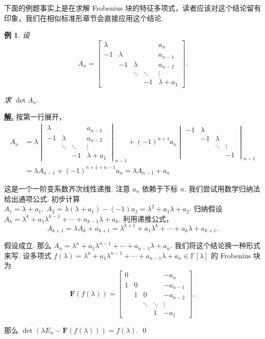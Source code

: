 \documentclass[10pt,openany]{article}
\theoremstyle{thmstyle} %
\theoremstyle{defstyle} %
\theoremstyle{prostyle} %
\theoremstyle{exastyle}
\newtheorem{example}[theorem]{例}
\theoremstyle{remstyle}
\newenvironment{solution}{\par\underline{\textbf{解.}} \;\fangsong}{\qed\par}
\newcommand{\F}{\mathbb{F}}
\begin{document}
下面的例题事实上是在求解 Frobenius 块的特征多项式，读者应该对这个结论留有印象，我们在相似标准形章节会直接应用这个结论.

\begin{example}
	设
	\[
	A_n =
	\begin{bmatrix}
		\lambda &        &        &        & a_n \\
		-1      & \lambda &       &        & a_{n-1} \\
		& -1     & \lambda &       & a_{n-2} \\
		&        & \ddots & \ddots & \vdots \\
		&        &        & -1     & \lambda + a_1
	\end{bmatrix}.
	\]
	
	求 \( \det A_n \).
\end{example}

\begin{solution}
	按第一行展开，
	\begin{align*}
		A_n&= \lambda \begin{vmatrix}
			\lambda &       &        & a_{n-1} \\
			-1     & \lambda &       & a_{n-2} \\
			& \ddots & \ddots & \vdots \\
			&        & -1     & \lambda + a_1
		\end{vmatrix}_{n-1}+ (-1)^{n+1} a_n \begin{vmatrix}
			-1      & \lambda &       &        \\
			& -1     & \lambda &        \\
			&        & \ddots & \vdots  \\
			&        &        & -1     
		\end{vmatrix}_{n-1} \\
		&= \lambda A_{n-1}+ (-1)^{n+1+n-1} a_n= \lambda A_{n-1}+ a_n
	\end{align*}
   
   这是一个一阶变系数齐次线性递推. 注意 \( a_n \) 依赖于下标 \( n \). 我们尝试用数学归纳法给出通项公式. 初步计算 \( A_1=\lambda+a_1, \; A_2= \lambda(\lambda+a_1)-(-1)a_2=\lambda^2+a_1\lambda+a_2 \). 归纳假设 \( A_k= \lambda^k+a_1\lambda^{k-1}+\cdots+a_{k-1}\lambda+a_k \). 利用递推公式，
   \[ A_{k+1}=  \lambda A_k+ a_{k+1}= \lambda^{k+1}+a_1\lambda^{k}+\cdots+a_{k}\lambda+a_{k+1}. \]
   
   假设成立. 那么 \( A_n= \lambda^n+a_1\lambda^{n-1}+\cdots+a_{n-1}\lambda+a_n  \). 我们将这个结论换一种形式来写. 设多项式 \( f(\lambda)=\lambda^n+a_1\lambda^{n-1}+\cdots+a_{n-1}\lambda+a_n  \in \F[\lambda] \) 的 Frobenius 块为
   \[ \bm{F}(f(\lambda))= \begin{bmatrix}
   	0 &        &        &        & -a_n \\
   	1   & 0 &       &        & -a_{n-1} \\
   	& 1     & 0 &       & -a_{n-2} \\
   	&        & \ddots & \ddots & \vdots \\
   	&        &        & 1     & -a_1
   \end{bmatrix}, \]
   
   那么 \( \det(\lambda E_n-\bm{F}(f(\lambda)))=f(\lambda) \).
\end{solution}
\end{document}
